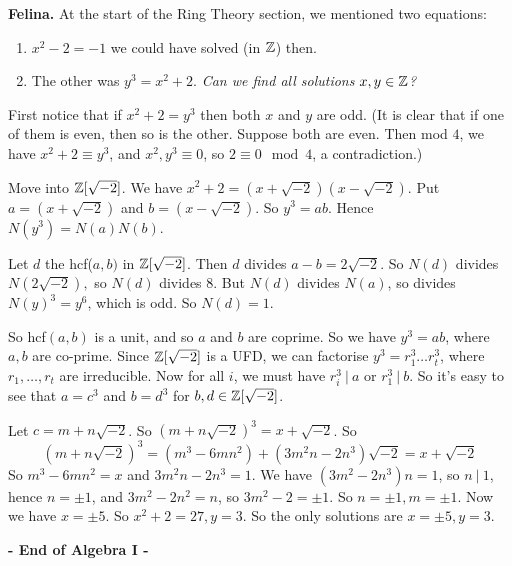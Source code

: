 \textbf{Felina.} At the start of the Ring Theory section, we mentioned two equations:\begin{enumerate}

\item $x^2 -2 = -1$ we could have solved (in $\mathbb{Z}$) then.
 
\item  The other was $y^3 = x^2 + 2$. \textit{ Can we find all solutions $x,y \in \mathbb{Z}$?}
  \end{enumerate}\vspace*{5pt}
  
  First notice that if $x^2 +2 = y^3$ then both $x$ and $y$ are odd. (It is clear that if one of them is even, then so is the other. Suppose both are even. Then mod $4$, we have $x^2 + 2 \equiv y^3$, and $x^2,y^3 \equiv 0$, so $2 \equiv 0 \mod 4$, a contradiction.)
  
 Move into $\mathbb{Z}[\sqrt{-2}]$. We have $x^2 +2 = (x + \sqrt{-2})(x-\sqrt{-2})$. Put $a = (x+\sqrt{-2})$ and $b = (x-\sqrt{-2}).$ So $y^3 = ab$. Hence $N(y^3) = N(a)N(b).$
 
  Let $d$ the hcf($a,b)$ in $\mathbb{Z}[\sqrt{-2}]$. Then $d$ divides $a-b = 2\sqrt{-2}$. So $N(d)$ divides $N(2\sqrt{-2}),$ so $N(d) $ divides $8$. But $N(d)$ divides $N(a)$, so divides $N(y)^3 = y^6$, which is odd. So $N(d) = 1$.
 
  So hcf$(a,b)$ is a unit, and so $a$ and $b$ are coprime. So we have $y^3 = ab$, where $a,b$ are co-prime. Since $\mathbb{Z}[\sqrt{-2}]$ is a UFD, we can factorise $y^3 = r_1^3 \dots r_t^3$, where $r_1,\dots,r_t$ are irreducible. Now for all $i$, we must have $r_i^3 ~|~ a$ or $r_1^3 ~|~ b$. So it's easy to see that $a=c^3$ and $b = d^3$ for $b,d \in \mathbb{Z}[\sqrt{-2}]$. 
  
  Let $c = m+n\sqrt{-2}$. So $(m + n\sqrt{-2})^3 = x + \sqrt{-2}$. So
  \[(m + n\sqrt{-2})^3  = (m^3 -6mn^2) + (3m^2n-2n^3)\sqrt{-2} = x+\sqrt{-2}\]
  So $m^3 - 6mn^2 = x$ and $3m^2n - 2n^3 = 1$. We have $(3m^2 - 2n^3)n = 1$, so $n~|~1$, hence $n = \pm 1$, and $3m^2 - 2n^2 = n$, so $3m^2 - 2 =\pm 1$. So $n = \pm 1, m = \pm 1$. Now we have $x = \pm 5$. So $x^2 + 2 = 27, y = 3$. So the only solutions are $x = \pm 5, y = 3$.
  
  
  \begin{center}
  
  \textsf{\textbf{- End of Algebra I -}}	
  \end{center}


